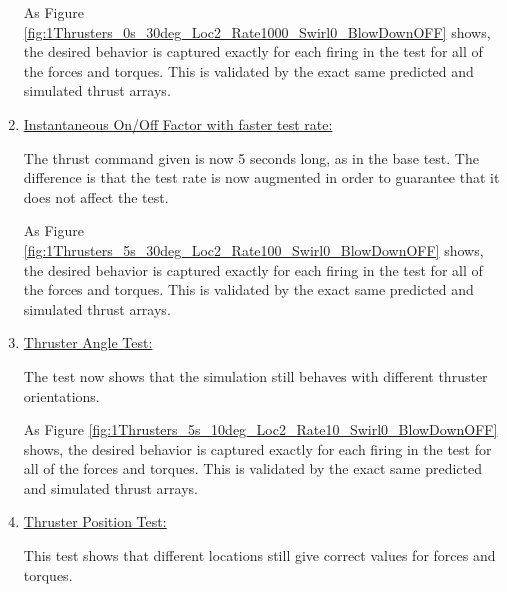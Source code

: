 \begin{enumerate}
	
	

	As Figure \ref{fig:1Thrusters_0s_30deg_Loc2_Rate1000_Swirl0_BlowDownOFF} shows, the desired behavior is captured exactly for each
	firing in the test for all of the forces and torques. This is validated by the exact same predicted and simulated thrust arrays.

	\item{\underline{Instantaneous On/Off Factor with faster test rate:} }

	

	The thrust command given is now 5 seconds long, as in the base test. The difference is that the test rate is now augmented in order to guarantee that it does not affect the test.

	

	As Figure \ref{fig:1Thrusters_5s_30deg_Loc2_Rate100_Swirl0_BlowDownOFF} shows, the desired behavior is captured exactly for each
	firing in the test for all of the forces and torques. This is validated by the exact same predicted and simulated thrust arrays.

	\item{\underline{Thruster Angle Test:}}

	

	The test now shows that the simulation still behaves with different thruster orientations.

	

	As Figure \ref{fig:1Thrusters_5s_10deg_Loc2_Rate10_Swirl0_BlowDownOFF} shows, the desired behavior is captured exactly for each
	firing in the test for all of the forces and torques. This is validated by the exact same predicted and simulated thrust arrays.


	\item{\underline{Thruster Position Test:} }

	

	This test shows that different locations still give correct values for forces and torques.

	


\end{enumerate}
